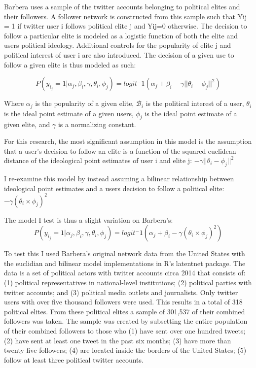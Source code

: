 \documentclass[../template.tex]{subfiles}
\begin{document}
Barbera uses a sample of the twitter accounts belonging to political elites and their followers. A follower network is constructed from this sample such that Yij = 1 if twitter user i follows political elite j and Yij=0 otherwise. The decision to follow a particular elite is modeled as a logistic function of both the elite and users political ideology. Additional controls for the popularity of elite j and political interest of user i are also introduced. The decision of a given use to follow a given elite is thus modeled as such:

\begin{equation} 
P(y _i _j = 1|\alpha _j, \beta _i, \gamma, \theta _i, \phi _j) = logit^-1 (\alpha _j + \beta _i -\gamma || \theta _i - \phi _j ||^2)
\end{equation}

Where \( \mathcal{\alpha}_j \) is the popularity of a given elite, \( \mathcal{B}_i \) is the political interest of a user, \( \mathcal{\theta}_i \) is the ideal point estimate of a given users, \( \mathcal{\phi}_j \) is the ideal point estimate of a given elite, and \( \mathcal{\gamma}\) is a normalizing constant. 

For this research, the most significant assumption in this model is the assumption that a user's decision to follow an elite is a function of the squared euclidean distance of the ideological point estimates of user i and elite j: \( -\mathcal{\gamma}||\mathcal{\theta}_i - \mathcal{\phi}_j||^2 \)

I re-examine this model by instead assuming a bilinear relationship between ideological point estimates and a users decision to follow a political elite: \( -\mathcal{\gamma}(\mathcal{\theta}_i \times \mathcal{\phi}_j)^2 \)

The model I test is thus a slight variation on Barbera's:
\begin{equation} 
P(y _i _j = 1|\alpha _j, \beta _i, \gamma, \theta _i, \phi _j) = logit^-1 (\alpha _j + \beta _i -\gamma (\theta _i \times \phi _j)^2)
\end{equation}


To test this I used Barbera’s original network data from the United States with the euclidian and bilinear model implementations in R’s latentnet package. The data is a set of political actors with twitter accounts circa 2014 that consists of: (1) political representatives in national-level institutions; (2) political parties with twitter accounts; and (3) political media outlets and journalists. Only twitter users with over five thousand followers were used. This results in a total of 318 political elites. From these political elites a sample of 301,537 of their combined followers was taken. The sample was created by subsetting the entire population of their combined followers to those who (1) have sent over one hundred tweets; (2) have sent at least one tweet in the past six months; (3) have more than twenty-five followers; (4) are located inside the borders of the United States; (5) follow at least three political twitter accounts.
\end{document}
